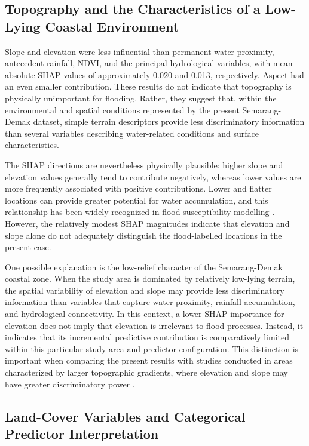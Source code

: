 \documentclass[11pt,twoside]{article}
\begin{document}
\subsection{Topography and the Characteristics of a Low-Lying Coastal Environment}\label{topography-coastal-environment}

Slope and elevation were less influential than permanent-water proximity, antecedent rainfall, NDVI, and the principal hydrological variables, with mean absolute SHAP values of approximately 0.020 and 0.013, respectively. Aspect had an even smaller contribution. These results do not indicate that topography is physically unimportant for flooding. Rather, they suggest that, within the environmental and spatial conditions represented by the present Semarang-Demak dataset, simple terrain descriptors provide less discriminatory information than several variables describing water-related conditions and surface characteristics.

The SHAP directions are nevertheless physically plausible: higher slope and elevation values generally tend to contribute negatively, whereas lower values are more frequently associated with positive contributions. Lower and flatter locations can provide greater potential for water accumulation, and this relationship has been widely recognized in flood susceptibility modelling \cite{Alcntara2025, Rahimi2026}. However, the relatively modest SHAP magnitudes indicate that elevation and slope alone do not adequately distinguish the flood-labelled locations in the present case.

One possible explanation is the low-relief character of the Semarang-Demak coastal zone. When the study area is dominated by relatively low-lying terrain, the spatial variability of elevation and slope may provide less discriminatory information than variables that capture water proximity, rainfall accumulation, and hydrological connectivity. In this context, a lower SHAP importance for elevation does not imply that elevation is irrelevant to flood processes. Instead, it indicates that its incremental predictive contribution is comparatively limited within this particular study area and predictor configuration. This distinction is important when comparing the present results with studies conducted in areas characterized by larger topographic gradients, where elevation and slope may have greater discriminatory power \cite{Costache2024, Rahimi2026}.

\subsection{Land-Cover Variables and Categorical Predictor Interpretation}\label{landcover-interpretation}
\end{document}
